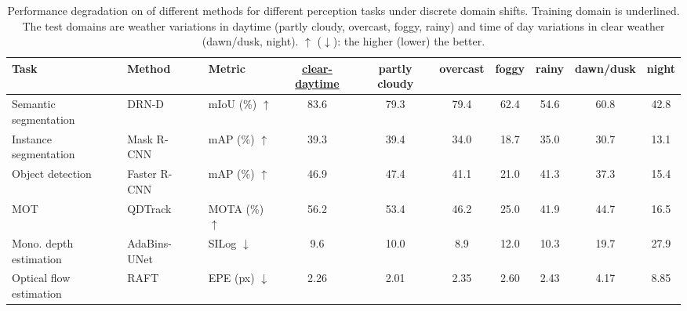 \begin{table*}[t!]
\centering
\footnotesize
\setlength{\tabcolsep}{5pt}
\begin{tabular}{lllccccccc}
\toprule
 \textbf{Task}    & \textbf{Method}  &  \textbf{Metric}     &  \underline{clear-daytime}     & partly cloudy & overcast & foggy & rainy  & dawn/dusk & night        \\ \midrule
 Semantic segmentation & DRN-D~\cite{yu2017dilated} & mIoU (\%) $\uparrow$ & 83.6 & 79.3 & 79.4 & 62.4 & 54.6 & 60.8 & 42.8  \\
Instance segmentation & Mask R-CNN~\cite{he2017mask} & mAP (\%) $\uparrow$ &  39.3 & 39.4 & 34.0 & 18.7 &  35.0 & 30.7 & 13.1 \\
Object detection & Faster R-CNN~\cite{cai2018cascade} & mAP (\%) $\uparrow$& 46.9 & 47.4 & 41.1 & 21.0 & 41.3 & 37.3 & 15.4  \\
MOT & QDTrack~\cite{pang2021quasi} & MOTA (\%) $\uparrow$ & 56.2 & 53.4 & 46.2 & 25.0 & 41.9 & 44.7 & 16.5 \\
Mono. depth estimation & AdaBins-UNet~\cite{bhat2021adabins} & SILog $\downarrow$ & 9.6 & 10.0 &  8.9 & 12.0 & 10.3 & 19.7 & 27.9 \\
Optical flow estimation & RAFT~\cite{teed2020raft} & EPE (px) $\downarrow$ &  2.26 & 2.01 & 2.35 & 2.60 &  2.43 &  4.17 & 8.85 \\
\bottomrule
\end{tabular}\caption{Performance degradation on \thedataset of different methods for different perception tasks under discrete domain shifts. Training domain is underlined. The test domains are weather variations in daytime (partly cloudy, overcast, foggy, rainy) and time of day variations in clear weather (dawn/dusk, night). $\uparrow$ ($\downarrow$): the higher (lower) the better.} \label{tab:ood_performance}
\vspace{-3mm}
\end{table*}

